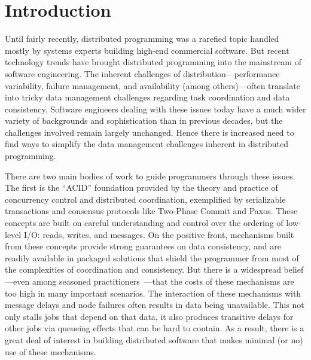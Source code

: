 \section{Introduction}

Until fairly recently, distributed programming was a rarefied topic handled mostly by systems experts building high-end commercial software. But recent technology trends have brought distributed programming into the mainstream of software engineering.  The inherent challenges of distribution---performance variability, failure management, and availability (among others)---often translate into tricky data management challenges regarding task coordination and data consistency.  Software engineers dealing with these issues today have a much wider variety of backgrounds and sophistication than in previous decades, but the challenges involved remain largely unchanged.  Hence there is increased need to find ways to simplify the data management challenges inherent in distributed programming.

There are two main bodies of work to guide programmers through these issues.  The first is the ``ACID'' foundation provided by the theory and practice of concurrency control and distributed coordination, exemplified by serializable transactions and consensus protocols like Two-Phase Commit and Paxos.  These concepts are built on careful understanding and control over the ordering of low-level I/O: reads, writes, and messages.  On the positive front, mechanisms built from these concepts provide strong guarantees on data consistency, and are readily available in packaged solutions that shield the programmer from most of the complexities of coordination and consistency.  But there is a widespread belief---even among seasoned practitioners~\cite{ladis}---that the costs of these mechanisms are too high in many important scenarios.  The interaction of these mechanisms with message delays and node failures often results in data being unavailable. This not only stalls jobs that depend on that data, it also produces transitive delays for other jobs via queueing effects that can be hard to contain.  As a result, there is a great deal of interest in building distributed software that makes minimal (or no) use of these mechanisms.

